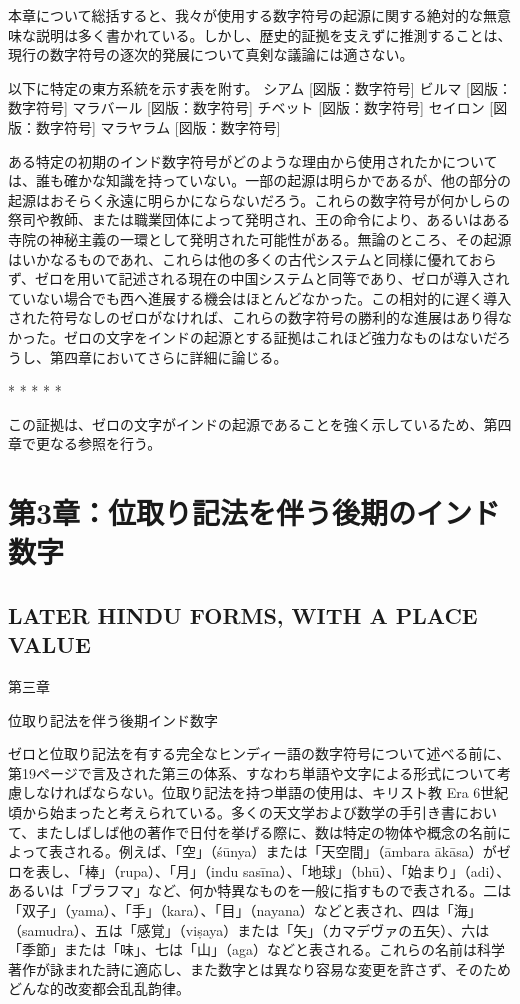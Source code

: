 \documentclass[a4paper,11pt,openany]{ltjsbook}
\begin{document}
本章について総括すると、我々が使用する数字符号の起源に関する絶対的な無意味な説明は多く書かれている。しかし、歴史的証拠を支えずに推測することは、現行の数字符号の逐次的発展について真剣な議論には適さない。

以下に特定の東方系統を示す表を附す。
シアム [図版：数字符号]
ビルマ [図版：数字符号]
マラバール [図版：数字符号]
チベット [図版：数字符号]
セイロン [図版：数字符号]
マラヤラム [図版：数字符号]

ある特定の初期のインド数字符号がどのような理由から使用されたかについては、誰も確かな知識を持っていない。一部の起源は明らかであるが、他の部分の起源はおそらく永遠に明らかにならないだろう。これらの数字符号が何かしらの祭司や教師、または職業団体によって発明され、王の命令により、あるいはある寺院の神秘主義の一環として発明された可能性がある。無論のところ、その起源はいかなるものであれ、これらは他の多くの古代システムと同様に優れておらず、ゼロを用いて記述される現在の中国システムと同等であり、ゼロが導入されていない場合でも西へ進展する機会はほとんどなかった。この相対的に遅く導入された符号なしのゼロがなければ、これらの数字符号の勝利的な進展はあり得なかった。ゼロの文字をインドの起源とする証拠はこれほど強力なものはないだろうし、第四章においてさらに詳細に論じる。

*       *       *       *       *

この証拠は、ゼロの文字がインドの起源であることを強く示しているため、第四章で更なる参照を行う。

\clearpage

\chapter{第3章：位取り記法を伴う後期のインド数字}
\section*{LATER HINDU FORMS, WITH A PLACE VALUE}

第三章

位取り記法を伴う後期インド数字

ゼロと位取り記法を有する完全なヒンディー語の数字符号について述べる前に、第19ページで言及された第三の体系、すなわち単語や文字による形式について考慮しなければならない。位取り記法を持つ単語の使用は、キリスト教 Era 6世紀頃から始まったと考えられている。多くの天文学および数学の手引き書において、またしばしば他の著作で日付を挙げる際に、数は特定の物体や概念の名前によって表される。例えば、「空」（śūnya）または「天空間」（āmbara ākāsa）がゼロを表し、「棒」（rupa）、「月」（indu sasīna）、「地球」（bhū）、「始まり」（adi）、あるいは「ブラフマ」など、何か特異なものを一般に指すもので表される。二は「双子」（yama）、「手」（kara）、「目」（nayana）などと表され、四は「海」（samudra）、五は「感覚」（viṣaya）または「矢」（カマデヴァの五矢）、六は「季節」または「味」、七は「山」（aga）などと表される。これらの名前は科学著作が詠まれた詩に適応し、また数字とは異なり容易な変更を許さず、そのためどんな的改変都会乱乱韵律。
\end{document}
